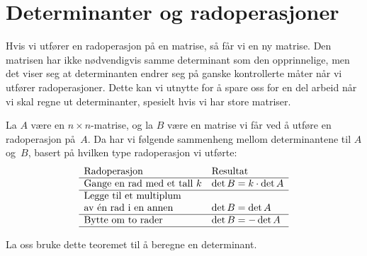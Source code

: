\section*{Determinanter og radoperasjoner}

Hvis vi utfører en radoperasjon på en matrise, så får vi en ny
matrise.  Den matrisen har ikke nødvendigvis samme determinant som den
opprinnelige, men det viser seg at determinanten endrer seg på ganske
kontrollerte måter når vi utfører radoperasjoner.  Dette kan vi
utnytte for å spare oss for en del arbeid når vi skal regne ut
determinanter, spesielt hvis vi har store matriser.

\begin{thm}
\label{thm:det-radop}
La $A$ være en $n \times n$-matrise, og la $B$ være en matrise vi får
ved å utføre en radoperasjon på~$A$.  Da har vi følgende sammenheng
mellom determinantene til $A$ og~$B$, basert på hvilken type
radoperasjon vi utførte:
\[
\begin{array}{ll}
\text{Radoperasjon} & \text{Resultat} \\\hline
\textup{Gange en rad med et tall~$k$} &
\det B = k \cdot \det A \\\hline
\textup{Legge til et multiplum}\\\textup{av én rad i en annen} &
\det B = \det A \\\hline
\textup{Bytte om to rader} &
\det B = - \det A \\\hline
\end{array}
\]
\end{thm}

\medskip
La oss bruke dette teoremet til å beregne en determinant.

